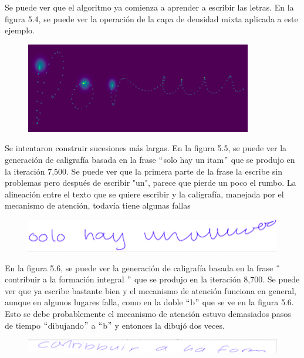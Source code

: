 Se puede ver que el algoritmo ya comienza a aprender a escribir las letras. En la figura 5.4, se puede ver la operación de la capa de densidad mixta aplicada a este ejemplo.

\begin{figure}[h]
\begin{center}
\includegraphics{./imag/porunmexico4700g.png}
\end{center}
\caption{}
\end{figure}

Se intentaron construir sucesiones más largas. En la figura 5.5, se puede ver la generación de caligrafía basada en la frase $``$solo hay un itam$"$ que se produjo en la iteración 7,500. Se puede ver que la primera parte de la frase la escribe sin problemas pero después de escribir "un", parece que pierde un poco el rumbo. La alineación entre el texto que se quiere escribir y la caligrafía, manejada por el mecanismo de atención, todavía tiene algunas fallas


\begin{figure}[h]
\begin{center}
\includegraphics{./imag/solo7500.png}
\end{center}
\caption{}
\end{figure}

\vspace{1em}

En la figura 5.6, se puede ver la generación de caligrafía basada en la frase $``$contribuir a la formación integral $"$ que se produjo en la iteración 8,700. Se puede ver que ya escribe bastante bien y el mecanismo de atención funciona en general, aunque en algunos lugares falla, como en la doble $``$b$"$ que se ve en la figura 5.6. Esto se debe probablemente el mecanismo de atención estuvo demasiados pasos de tiempo $``$dibujando$"$ a $``$b$"$ y entonces la dibujó dos veces. 


\begin{figure}[h]
\begin{center}
\includegraphics{./imag/contribuir8700.png}
\end{center}
\caption{}
\end{figure}

